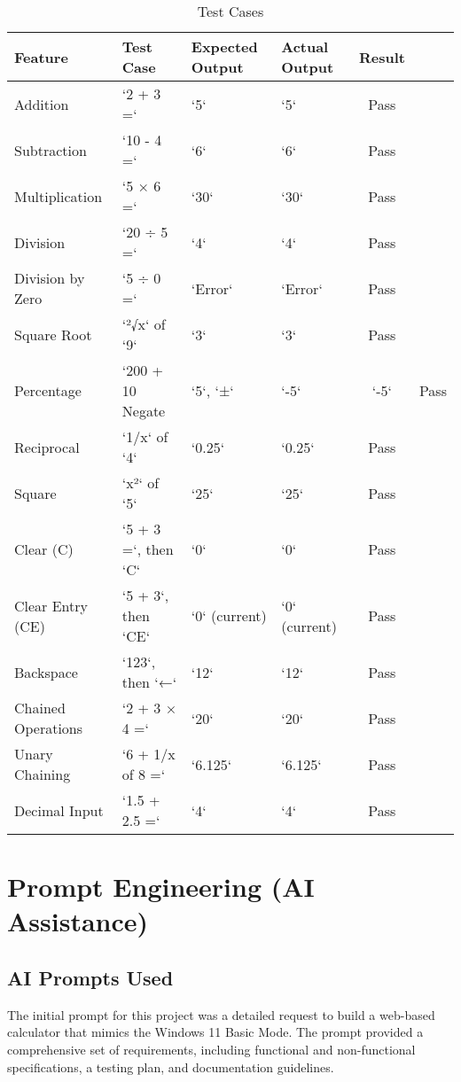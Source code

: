 \documentclass{article}
\begin{document}
\begin{table}[h!]
\centering
\begin{tabularx}{\textwidth}{|l|X|l|l|c|}
\hline
\textbf{Feature} & \textbf{Test Case} & \textbf{Expected Output} & \textbf{Actual Output} & \textbf{Result} \\
\hline
Addition & `2 + 3 =` & `5` & `5` & Pass \\
\hline
Subtraction & `10 - 4 =` & `6` & `6` & Pass \\
\hline
Multiplication & `5 × 6 =` & `30` & `30` & Pass \\
\hline
Division & `20 ÷ 5 =` & `4` & `4` & Pass \\
\hline
Division by Zero & `5 ÷ 0 =` & `Error` & `Error` & Pass \\
\hline
Square Root & `²√x` of `9` & `3` & `3` & Pass \\
\hline
Percentage & `200 + 10 %
\hline
Negate & `5`, `±` & `-5` & `-5` & Pass \\
\hline
Reciprocal & `1/x` of `4` & `0.25` & `0.25` & Pass \\
\hline
Square & `x²` of `5` & `25` & `25` & Pass \\
\hline
Clear (C) & `5 + 3 =`, then `C` & `0` & `0` & Pass \\
\hline
Clear Entry (CE) & `5 + 3`, then `CE` & `0` (current) & `0` (current) & Pass \\
\hline
Backspace & `123`, then `←` & `12` & `12` & Pass \\
\hline
Chained Operations & `2 + 3 × 4 =` & `20` & `20` & Pass \\
\hline
Unary Chaining & `6 + 1/x of 8 =` & `6.125` & `6.125` & Pass \\
\hline
Decimal Input & `1.5 + 2.5 =` & `4` & `4` & Pass \\
\hline
\end{tabularx}
\caption{Test Cases}
\end{table}

\section{Prompt Engineering (AI Assistance)}

\subsection{AI Prompts Used}
The initial prompt for this project was a detailed request to build a web-based calculator that mimics the Windows 11 Basic Mode. The prompt provided a comprehensive set of requirements, including functional and non-functional specifications, a testing plan, and documentation guidelines.
\end{document}
